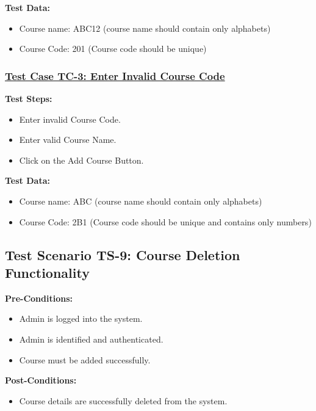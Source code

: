 \textbf{Test Data:}
\begin{itemize}

\item Course name: ABC12 (course name should contain only alphabets)
\item Course Code: 201 (Course code should be unique)

\end{itemize}

\subsubsection{\underline{Test Case TC-3: Enter Invalid Course Code}}
\textbf{Test Steps:}
\begin{itemize}

\item Enter invalid Course Code.
\item Enter valid Course Name.
\item Click on the Add Course Button.

\end{itemize}

\textbf{Test Data:}
\begin{itemize}

\item Course name: ABC (course name should contain only alphabets)
\item Course Code: 2B1 (Course code should be unique and contains only numbers)

\end{itemize}

\subsection{Test Scenario TS-9: Course Deletion Functionality}
\textbf{Pre-Conditions: }
\begin{itemize}

\item Admin is logged into the system.
\item Admin is identified and authenticated.
\item Course must be added successfully.

\end{itemize}

\textbf{Post-Conditions: } 
\begin{itemize}
\item Course details are successfully deleted from the system.
\end{itemize}


